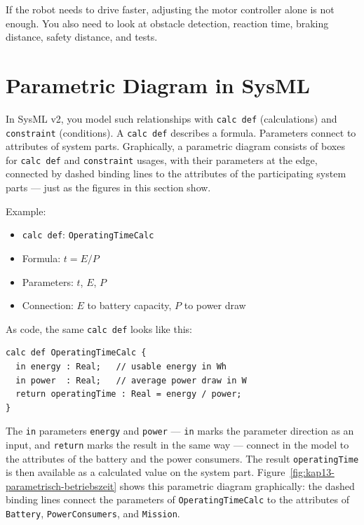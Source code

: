 \begin{praxisbox}
If the robot needs to drive faster, adjusting the motor controller alone is not enough. You also need to look at obstacle detection, reaction time, braking distance, safety distance, and tests.
\end{praxisbox}

\section{Parametric Diagram in SysML}
In SysML v2, you model such relationships with \texttt{calc def} (calculations) and \texttt{constraint} (conditions). A \texttt{calc def} describes a formula. Parameters connect to attributes of system parts. Graphically, a parametric diagram consists of boxes for \texttt{calc def} and \texttt{constraint} usages, with their parameters at the edge, connected by dashed binding lines to the attributes of the participating system parts — just as the figures in this section show.

Example:

\begin{itemize}
    \item \texttt{calc def}: \texttt{OperatingTimeCalc}
    \item Formula: \(t = E / P\)
    \item Parameters: \(t\), \(E\), \(P\)
    \item Connection: \(E\) to battery capacity, \(P\) to power draw
\end{itemize}

As code, the same \texttt{calc def} looks like this:

\begin{lstlisting}
calc def OperatingTimeCalc {
  in energy : Real;   // usable energy in Wh
  in power  : Real;   // average power draw in W
  return operatingTime : Real = energy / power;
}
\end{lstlisting}

The \texttt{in} parameters \texttt{energy} and \texttt{power} — \texttt{in} marks the parameter direction as an input, and \texttt{return} marks the result in the same way — connect in the model to the attributes of the battery and the power consumers. The result \texttt{operatingTime} is then available as a calculated value on the system part. Figure~\ref{fig:kap13-parametrisch-betriebszeit} shows this parametric diagram graphically: the dashed binding lines connect the parameters of \texttt{OperatingTimeCalc} to the attributes of \texttt{Battery}, \texttt{PowerConsumers}, and \texttt{Mission}.

